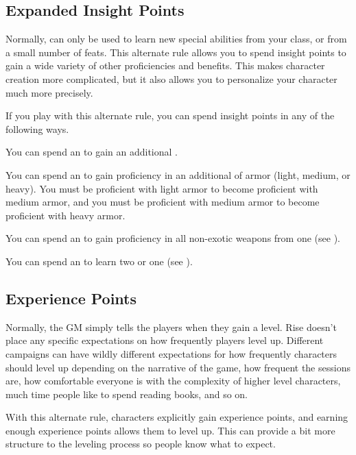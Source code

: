   \subsection{Expanded Insight Points}
    Normally,  can only be used to learn new special abilities from your class, or from a small number of feats.
    This alternate rule allows you to spend insight points to gain a wide variety of other proficiencies and benefits.
    This makes character creation more complicated, but it also allows you to personalize your character much more precisely.

    If you play with this alternate rule, you can spend insight points in any of the following ways.
    \begin{raggeditemize}
      \item You can spend an  to gain an additional .
      \item You can spend an  to gain proficiency in an additional  of armor (light, medium, or heavy).
        You must be proficient with light armor to become proficient with medium armor, and you must be proficient with medium armor to become proficient with heavy armor.
      \item You can spend an  to gain proficiency in all non-exotic weapons from one  (see ).
      \item You can spend an  to learn two  or one  (see ).
    \end{raggeditemize}

  \subsection{Experience Points}
    Normally, the GM simply tells the players when they gain a level.
    Rise doesn't place any specific expectations on how frequently players level up.
    Different campaigns can have wildly different expectations for how frequently characters should level up depending on the narrative of the game, how frequent the sessions are, how comfortable everyone is with the complexity of higher level characters, much time people like to spend reading books, and so on.

    With this alternate rule, characters explicitly gain experience points, and earning enough experience points allows them to level up.
    This can provide a bit more structure to the leveling process so people know what to expect.

